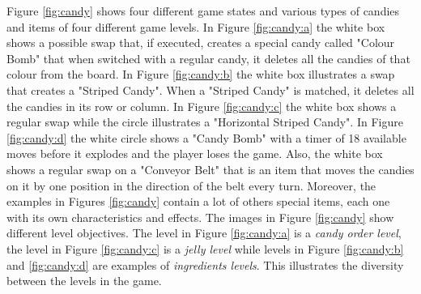 Figure \ref{fig:candy} shows four different game states and various types of candies and items of four different game levels.  In Figure \ref{fig:candy:a} the white box shows a possible swap that, if executed, creates a special candy called "Colour Bomb" that when switched with a regular candy, it deletes all the candies of that colour from the board. In Figure \ref{fig:candy:b} the white box illustrates a swap that creates a "Striped Candy". When a "Striped Candy" is matched, it deletes all the candies in its row or column. In Figure \ref{fig:candy:c} the white box shows a regular swap while the circle illustrates a "Horizontal Striped Candy". In Figure \ref{fig:candy:d} the white circle shows a "Candy Bomb" with a timer of 18 available moves before it explodes and the player loses the game. Also, the white box shows a regular swap on a "Conveyor Belt" that is an item that moves the candies on it by one position in the direction of the belt every turn. Moreover, the examples in Figures \ref{fig:candy} contain a lot of others special items, each one with its own characteristics and effects. The images in Figure \ref{fig:candy} show different level objectives. The level in Figure \ref{fig:candy:a} is a \textit{candy order level}, the level in Figure \ref{fig:candy:c} is a \textit{jelly level} while levels in Figure \ref{fig:candy:b} and \ref{fig:candy:d} are examples of \textit{ingredients levels}. This illustrates the diversity between the levels in the game.

